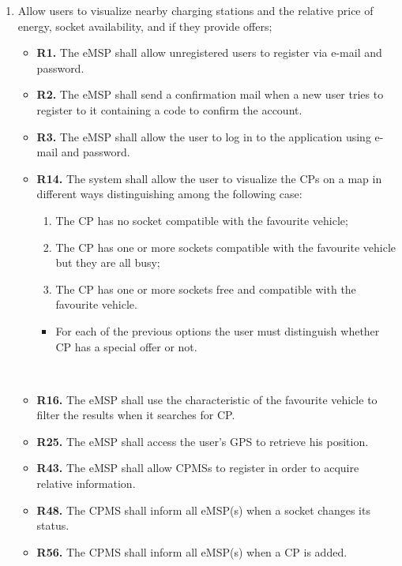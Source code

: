 \documentclass{Configuration_Files/PoliMi3i_thesis}
\begin{document}
\begin{enumerate}[label=\textbf{G\arabic*}]

    \item Allow users to visualize nearby charging stations and the relative price of energy, socket availability, and if they provide offers;
        \begin{itemize}
            \item \textbf{R1.} The eMSP shall allow unregistered users to register via e-mail and password.
            \item \textbf{R2.} The eMSP shall send a confirmation mail when a new user tries to register to it containing a code to confirm the account.
            \item \textbf{R3.} The eMSP shall allow the user to log in to the application using e-mail and password.
            \item \textbf{R14.}  The system shall allow the user to visualize the CPs on a map in different ways distinguishing among the following case:
                \begin{enumerate}
                    \item The CP has no socket compatible with the favourite vehicle;
                    \item The CP has one or more sockets compatible with the favourite vehicle but they are all busy;
                    \item The CP has one or more sockets free and compatible with the favourite vehicle.
                \end{enumerate}
                \begin{itemize}
                    \item For each of the previous options the user must distinguish whether CP has a special offer or not.
                \end{itemize}\B\\
            \item \textbf{R16.} The eMSP shall use the characteristic of the favourite vehicle to filter the results when it searches for CP.
            \item \textbf{R25.} The eMSP shall access the user’s GPS to retrieve his position.
            \item \textbf{R43.} The eMSP shall allow CPMSs to register in order to acquire relative information.
            \item \textbf{R48.} The CPMS shall inform all eMSP(s) when a socket changes its status.
            \item \textbf{R56.} The CPMS shall inform all eMSP(s) when a CP is added.

\end{itemize}
\end{enumerate}
\end{document}
